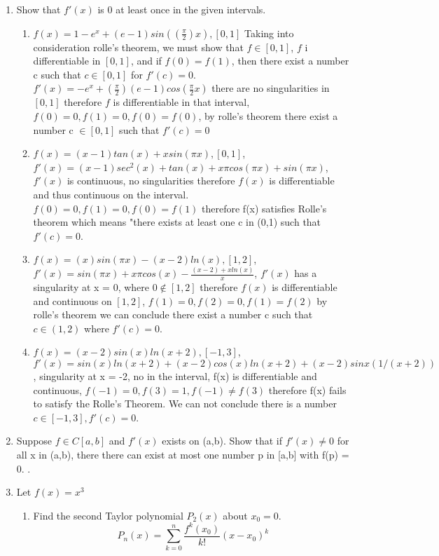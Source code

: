 \documentclass{article}
\begin{document}
\begin{enumerate}
\begin{enumerate}
    \end{enumerate}
    \item Show that $f'(x)$ is 0 at least once in the given intervals. 
    \begin{enumerate}
        \item $f(x) = 1 - e^x + (e-1)sin((\frac{\pi}{2})x), [0,1]$ Taking into consideration rolle's theorem, we must show that $f\in [0,1]$, $f$ i differentiable in $[0,1]$, and if $f(0) = f(1)$, then there exist a number c such that $c \in [0,1]$ for $f'(c) = 0$. $f'(x) = -e^x + (\frac{\pi}{2})(e-1)cos(\frac{\pi}{2}x)$ there are no singularities in $[0,1]$ therefore $f$ is differentiable in that interval, $f(0) = 0, f(1) = 0, f(0) = f(0)$, by rolle's theorem there exist a number c $\in [0,1]$ such that $f'(c) = 0$
        \item $f(x) = (x-1)tan(x) + xsin(\pi x), [0,1]$, $f'(x) = (x-1)sec^2(x) + tan(x) + x\pi cos(\pi x) + sin(\pi x)$, $f'(x)$ is continuous, no singularities therefore $f(x)$ is differentiable and thus continuous on the interval. $f(0) = 0, f(1) = 0, f(0) = f(1)$ therefore f(x) satisfies Rolle's theorem which means "there exists at least one c in (0,1) such that $f'(c) = 0$.
        \item $f(x) = (x)sin(\pi x) - (x-2)ln(x), [1,2]$, $f'(x) = sin(\pi x) + x\pi cos(x) -\frac{(x-2) + xln(x)}{x}$, $f'(x)$ has a singularity at x = 0, where $0 \not \in [1,2]$ therefore $f(x)$ is differentiable and continuous on $[1,2]$, $f(1) = 0 , f(2) = 0, f(1) = f(2)$ by rolle's theorem we can conclude there exist a number c such that $c \in (1,2)$ where $f'(c) = 0$.
        \item $f(x) = (x-2)sin(x)ln(x+2), [-1,3]$, $f'(x) =sin(x)ln(x+2) + (x-2)cos(x)ln(x+2) + (x -2)sinx(1/(x+2))$, singularity at x = -2, no in the interval, f(x) is differentiable and continuous, $f(-1) = 0, f(3) = 1, f(-1) \neq f(3)$ therefore f(x) fails to satisfy the Rolle's Theorem. We can not conclude there is a number $c \in [-1,3], f'(c) = 0$.
    \end{enumerate}
    \item Suppose $f\in C[a,b]$ and $f'(x)$ exists on (a,b). Show that if $f'(x) \neq 0$ for all x in (a,b), there there can exist at most one
    number p in [a,b] with f(p) = 0. .
    \item Let $f(x) = x^3$
    \begin{enumerate}
        \item Find the second Taylor polynomial $P_2(x)$ about $x_0 = 0$.
        $$P_n(x) = \sum_{k=0}^{n} \frac{f^{k}(x_0)}{k!}(x-x_0)^{k}$$

\end{enumerate}
\end{enumerate}
\end{document}
